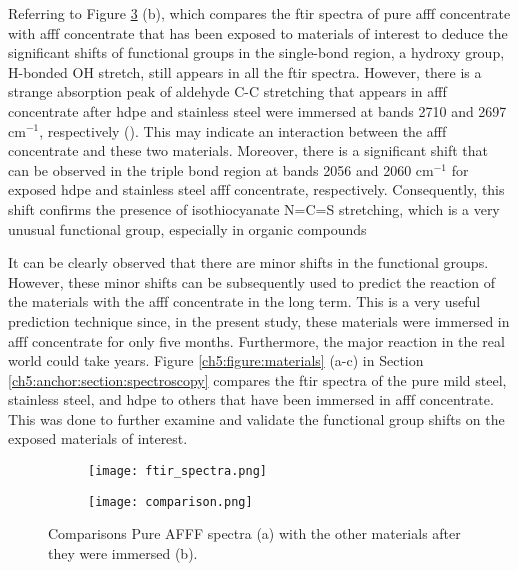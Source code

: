 Referring to Figure \ref{ch5:figure:spectra} (b), which compares the \acrshort{ftir} spectra of pure \acrshort{afff} concentrate with \acrshort{afff} concentrate that has been exposed to materials of interest to deduce the significant shifts of functional groups in the single-bond region, a hydroxy group, H-bonded OH stretch, still appears in all the \acrshort{ftir} spectra. However, there is a strange absorption peak of aldehyde C-C stretching that appears in \acrshort{afff} concentrate after \acrshort{hdpe} and stainless steel were immersed at bands 2710 and 2697 cm$^{-1}$, respectively (\cite{lin1991handbook}). This may indicate an interaction between the \acrshort{afff} concentrate and these two materials. Moreover, there is a significant shift that can be observed in the triple bond region at bands 2056 and 2060 cm$^{-1}$ for exposed \acrshort{hdpe} and stainless steel \acrshort{afff} concentrate, respectively. Consequently, this shift confirms the presence of isothiocyanate N=C=S stretching, which is a very unusual functional group, especially in organic compounds

It can be clearly observed that there are minor shifts in the functional groups. However, these minor shifts can be subsequently used to predict the reaction of the materials with the \acrshort{afff} concentrate in the long term. This is a very useful prediction technique since, in the present study, these materials were immersed in \acrshort{afff} concentrate for only five months. Furthermore, the major reaction in the real world could take years. Figure \ref{ch5:figure:materials} (a-c) in Section \ref{ch5:anchor:section:spectroscopy} compares the \acrshort{ftir} spectra of the pure mild steel, stainless steel, and \acrshort{hdpe} to others that have been immersed in \acrshort{afff} concentrate. This was done to further examine and validate the functional group shifts on the exposed materials of interest.

\begin{figure}[H]
\centering

\begin{subfigure}{.45\textwidth}
    \texttt{[image: ftir\_spectra.png]}
    \caption{}
    \label{ch5:figure:spectra:a}
\end{subfigure}
\begin{subfigure}{.45\textwidth}
    \texttt{[image: comparison.png]}
    \caption{}
    \label{ch5:figure:spectra:b}
\end{subfigure}

\caption{Comparisons Pure AFFF spectra (a) with the other materials after they were immersed (b).}
\label{ch5:figure:spectra}
\end{figure}

